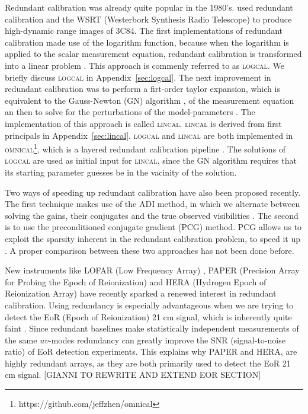 \documentclass[useAMS,usenatbib]{mn2e}
\begin{document}
Redundant calibration was already quite popular in the 1980's. \citet{Noordam1982} used redundant calibration and the WSRT (Westerbork Synthesis Radio Telescope) to produce high-dynamic range images of 3C84.
The first implementations of redundant calibration made use of the logarithm function, because when the logarithm is applied to the scalar measurement equation, redundant 
calibration is transformed into a linear problem \citep{Wieringa1992,Camps2003,Liu2010}. This approach is commenly referred to as \textsc{logcal}.
We briefly discuss \textsc{logcal} in Appendix~\ref{sec:logcal}. The next improvement in redundant calibration was to perform a firt-order taylor expansion, which is equivalent to the Gauss-Newton (GN) algorithm \citep{Kurien2016}, of the measurement equation an then to solve for the
perturbations of the model-parameters \citep{Liu2010}. The implementation of  this approach is called \textsc{lincal}. \textsc{lincal} is derived from first principals in Appendix~\ref{sec:lincal}. 
\textsc{logcal} and \textsc{lincal} are both implemented in \textsc{omnical}\footnote{https://github.com/jeffzhen/omnical}, which is a layered redundant calibration pipeline \citep{Zheng2014,Ali2015}.
The solutions of \textsc{logcal} are used as initial input for \textsc{lincal}, since the GN algorithm requires that its starting parameter guesses be in the vacinity 
of the solution.

Two ways of speeding up redundant calibration have also been proposed recently. The first technique makes use of the ADI method, in which we alternate between solving the gains, their conjugates and 
the true observed visibilities \citep{Wijnholds2012,Marthi2014}. The second is to use the preconditioned conjugate gradient (PCG) method. PCG allows us to exploit the sparsity inherent in the redundant calibration problem, 
to speed it up \citep{Liu2010}. A proper comparison between these two approaches has not been done before.

New instruments like LOFAR (Low Frequency Array) \citep{Noorishad2012}, PAPER (Precision Array for Probing the Epoch of Reionization) \citep{Ali2015} and HERA (Hydrogen Epoch of Reionization Array) \citep{deboer2015} have recently sparked a renewed interest in redundant calibration. Using redundancy is especially advantageous when we are trying to detect the EoR (Epoch of Reionization) 21 cm signal,
which is inherently quite faint \citep{Parsons2012}. Since redundant baselines make statistically independent measurements of the same $uv$-modes redundancy can greatly 
improve the SNR (signal-to-noise ratio) of EoR detection experiments. This explains why PAPER and HERA, are highly redundant arrays, as they are both primarily used to detect the EoR 21 cm signal.
[GIANNI TO REWRITE AND EXTEND EOR SECTION]
\end{document}
